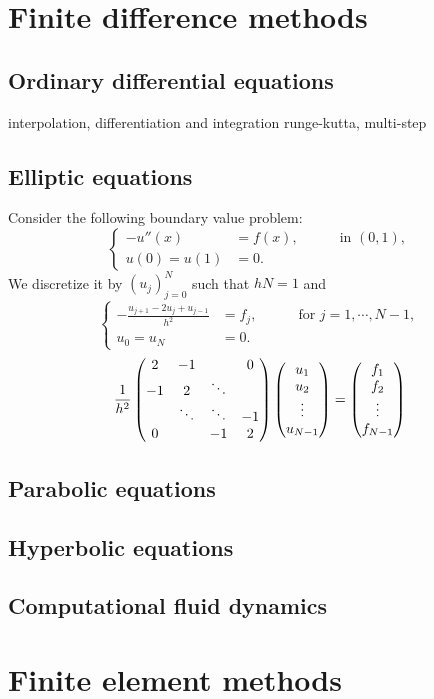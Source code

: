 \documentclass{../note}
\begin{document}
\chapter{Finite difference methods}
\section{Ordinary differential equations}
interpolation, differentiation and integration
runge-kutta, multi-step
\section{Elliptic equations}
\begin{prb}
Consider the following boundary value problem:
\[\left\{\begin{alignedat}{2}
-u''(x)&=f(x),&\quad&\text{ in }(0,1),\\
u(0)=u(1)&=0.&&
\end{alignedat}\right.\]
We discretize it by $(u_j)_{j=0}^N$ such that $hN=1$ and
\[\left\{\begin{alignedat}{2}
-\frac{u_{j+1}-2u_j+u_{j-1}}{h^2}&=f_j,&\quad&\text{ for }j=1,\cdots,N-1,\\
u_0=u_N&=0.&&
\end{alignedat}\right.\]
\[\frac1{h^2}\begin{pmatrix}2&-1&&0\\-1&2&\ddots&\\&\ddots&\ddots&-1\\0&&-1&2\end{pmatrix}\begin{pmatrix}u_1\\u_2\\\vdots\\u_{N-1}\end{pmatrix}=\begin{pmatrix}f_1\\f_2\\\vdots\\f_{N-1}\end{pmatrix}\]
\end{prb}

\section{Parabolic equations}
\section{Hyperbolic equations}
\section{Computational fluid dynamics}

\chapter{Finite element methods}
\end{document}
